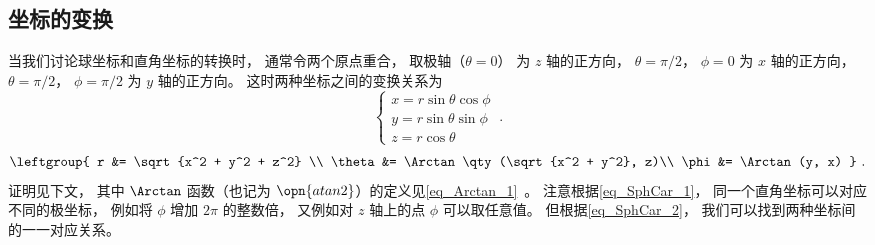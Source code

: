

\subsection{坐标的变换}
当我们讨论球坐标和直角坐标的转换时， 通常令两个原点重合， 取极轴（$\theta = 0$） 为 $z$ 轴的正方向， $\theta = \pi/2$， $\phi = 0$ 为 $x$ 轴的正方向， $\theta = \pi/2$， $\phi = \pi/2$ 为 $y$ 轴的正方向。 这时两种坐标之间的变换关系为
\begin{equation}\label{eq_SphCar_1}
\begin{cases}
x = r\sin \theta \cos \phi \\
y = r\sin \theta \sin \phi \\
z = r\cos \theta 
\end{cases}~.
\end{equation}
\begin{equation}\label{eq_SphCar_2}
\leftgroup{
r &= \sqrt {x^2 + y^2 + z^2} \\
\theta  &= \Arctan\qty(\sqrt{x^2 + y^2}, z)\\
\phi  &= \Arctan(y, x)
}~.\end{equation}
证明见下文， 其中 $\Arctan$ 函数（也记为 $\opn{atan2}$）的定义见\autoref{eq_Arctan_1}~。 注意根据\autoref{eq_SphCar_1}， 同一个直角坐标可以对应不同的极坐标， 例如将 $\phi$ 增加 $2\pi$ 的整数倍， 又例如对 $z$ 轴上的点 $\phi$ 可以取任意值。 但根据\autoref{eq_SphCar_2}， 我们可以找到两种坐标间的一一对应关系。

